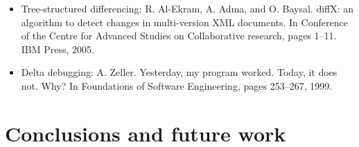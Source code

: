 \begin{itemize}
\item
Tree-structured differencing: R. Al-Ekram, A. Adma, and O. Baysal. diffX: an algorithm to detect changes in multi-version XML documents. In Conference of the Centre for Advanced Studies on Collaborative research, pages 1–11. IBM Press, 2005.

\item
Delta debugging: A. Zeller. Yesterday, my program worked. Today, it does not. Why? In Foundations of Software Engineering, pages 253–267, 1999.

\end{itemize}

\section{Conclusions and future work}
\label{sec:conclusions}


\begin{acks}
  

\end{acks}
